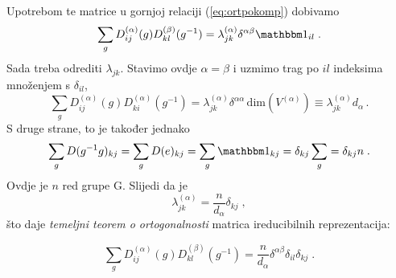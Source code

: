 Upotrebom te matrice u gornjoj relaciji (\ref{eq:ortpokomp})  dobivamo
\begin{equation}
\sum_g D^{(\alpha)}_{ij}(g) D^{(\beta)}_{kl}(g^{-1}) = 
 \lambda^{(\alpha)}_{jk} \delta^{\alpha\beta} \Eins_{il} \;.
\end{equation}
Sada treba odrediti $\lambda_{jk}$. 
Stavimo ovdje $\alpha =\beta$ i uzmimo trag po $il$ indeksima
množenjem s $\delta_{il}$,
\begin{displaymath}
\sum_g D^{(\alpha)}_{ij}(g) D^{(\alpha)}_{ki}(g^{-1}) = 
 \lambda^{(\alpha)}_{jk} \delta^{\alpha\alpha}\, \textrm{dim}(V^{(\alpha)})
 \equiv \lambda^{(\alpha)}_{jk} d_{\alpha} \,.
\end{displaymath}
S druge strane, to je također jednako
\begin{displaymath}
 \sum_g D(g^{-1}g)_{kj}=\sum_g D(e)_{kj}= \sum_g \Eins_{kj} = \delta_{kj} \sum_g 
 = \delta_{kj} n \;.
\end{displaymath}
Ovdje je $n$ red grupe G.
Slijedi da je
\begin{displaymath}
\lambda^{(\alpha)}_{jk}= \frac{n}{d_{\alpha}}\delta_{kj} \;,
\end{displaymath}
što daje \emph{temeljni teorem o ortogonalnosti} matrica ireducibilnih
reprezentacija:
\begin{teorem}
\begin{displaymath}
\sum_g D^{(\alpha)}_{ij}(g) D^{(\beta)}_{kl}(g^{-1}) =
 \frac{n}{d_{\alpha}}\delta^{\alpha\beta}\delta_{il}\delta_{kj} \;.
\end{displaymath}
\label{tm:ortogonalnost}
\end{teorem}

